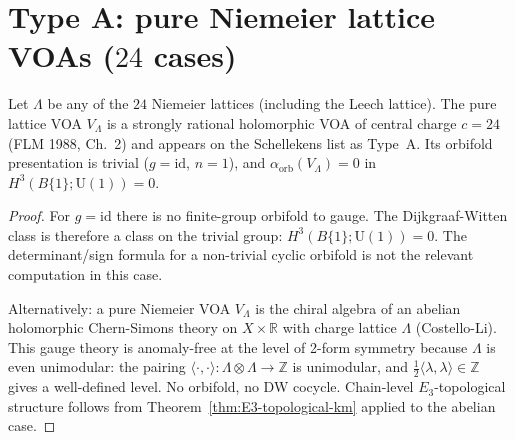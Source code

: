 \section{Type A: pure Niemeier lattice VOAs ($24$ cases)}
\label{sec:schellekens-typeA-pure-niemeier}

\begin{proposition}
\label{prop:schellekens-typeA-alpha-zero}
Let $\Lambda$ be any of the $24$ Niemeier lattices (including the
Leech lattice). The pure lattice VOA $V_\Lambda$ is a strongly rational
holomorphic VOA of central charge $c = 24$ (FLM 1988, Ch.~2) and
appears on the Schellekens list as Type~A. Its orbifold presentation
is trivial ($g = \mathrm{id}$, $n = 1$), and
$\alpha_{\mathrm{orb}}(V_\Lambda) = 0$ in
$H^3(B\{1\}; \mathrm{U}(1)) = 0$.
\end{proposition}

\begin{proof}
For $g = \mathrm{id}$ there is no finite-group orbifold to gauge. The
Dijkgraaf-Witten class is therefore a class on the trivial group:
$H^3(B\{1\};\mathrm{U}(1))=0$. The determinant/sign formula for a
non-trivial cyclic orbifold is not the relevant computation in this
case.

Alternatively: a pure Niemeier VOA $V_\Lambda$ is the chiral algebra
of an abelian holomorphic Chern-Simons theory on $X \times \mathbb{R}$
with charge lattice $\Lambda$ (Costello-Li). This gauge theory is
anomaly-free at the level of 2-form symmetry because $\Lambda$ is
even unimodular: the pairing $\langle \cdot, \cdot \rangle \colon
\Lambda \otimes \Lambda \to \mathbb{Z}$ is unimodular, and
$\frac{1}{2} \langle \lambda, \lambda \rangle \in \mathbb{Z}$ gives
a well-defined level. No orbifold, no DW cocycle. Chain-level
$E_3$-topological structure follows from
Theorem~\ref*{thm:E3-topological-km} applied to the abelian case.
\end{proof}

